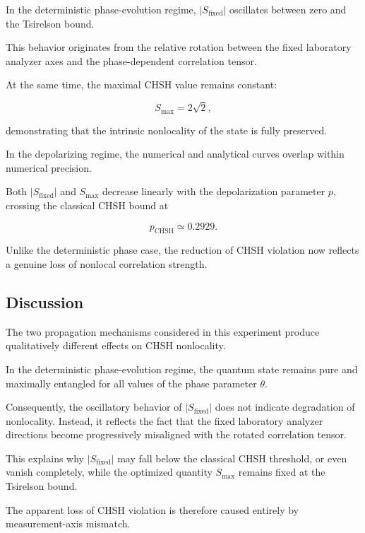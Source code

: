 In the deterministic phase-evolution regime, \( |S_{\mathrm{fixed}}| \) oscillates between zero and the Tsirelson bound.

This behavior originates from the relative rotation between the fixed laboratory analyzer axes and the phase-dependent correlation tensor.

At the same time, the maximal CHSH value remains constant:

\[
S_{\max}
=
2\sqrt{2},
\]

demonstrating that the intrinsic nonlocality of the state is fully preserved.

\medskip

In the depolarizing regime, the numerical and analytical curves overlap within numerical precision.

Both \( |S_{\mathrm{fixed}}| \) and \( S_{\max} \) decrease linearly with the depolarization parameter \(p\), crossing the classical CHSH bound at

\[
p_{\mathrm{CHSH}}
\simeq
0.2929.
\]

Unlike the deterministic phase case, the reduction of CHSH violation now reflects a genuine loss of nonlocal correlation strength.


\subsection{Discussion}

The two propagation mechanisms considered in this experiment produce qualitatively different effects on CHSH nonlocality.

In the deterministic phase-evolution regime, the quantum state remains pure and maximally entangled for all values of the phase parameter \( \theta \).

Consequently, the oscillatory behavior of \( |S_{\mathrm{fixed}}| \) does not indicate degradation of nonlocality. Instead, it reflects the fact that the fixed laboratory analyzer directions become progressively misaligned with the rotated correlation tensor.

This explains why \( |S_{\mathrm{fixed}}| \) may fall below the classical CHSH threshold, or even vanish completely, while the optimized quantity \( S_{\max} \) remains fixed at the Tsirelson bound.

The apparent loss of CHSH violation is therefore caused entirely by measurement-axis mismatch.

